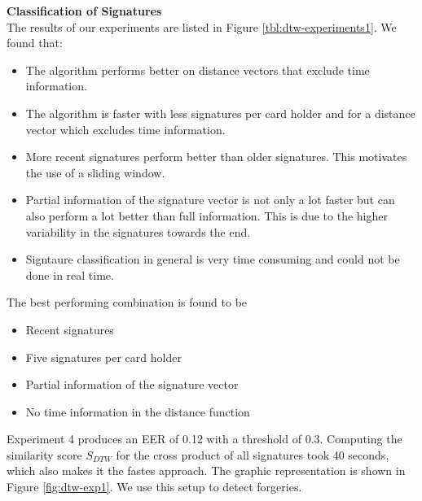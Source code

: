 \documentclass[a4paper, oneside]{csthesis}
\begin{document}
\noindent\textbf{Classification of Signatures}\\
The results of our experiments are listed in Figure \ref{tbl:dtw-experiments1}.
We found that:
\begin{itemize}
\item The algorithm performs better on distance vectors that exclude time information.
\item The algorithm is faster with less signatures per card holder and for a distance vector which excludes time information.
\item More recent signatures perform better than older signatures. This motivates the use of a sliding window.
\item Partial information of the signature vector is not only a lot faster but can also perform a lot better than full information. This is due to the higher variability in the signatures towards the end.
\item Signtaure classification in general is very time consuming and could not be done in real time.
\end{itemize}

The best performing combination is found to be
\begin{itemize}
\item Recent signatures
\item Five signatures per card holder
\item Partial information of the signature vector
\item No time information in the distance function
\end{itemize}

Experiment 4 produces an EER of 0.12 with a threshold of 0.3. Computing the similarity score $S_{DTW}$ for the cross product of all signatures took 40 seconds, which also makes it the fastes approach. The graphic representation is shown in Figure \ref{fig:dtw-exp1}. We use this setup to detect forgeries.
\end{document}
